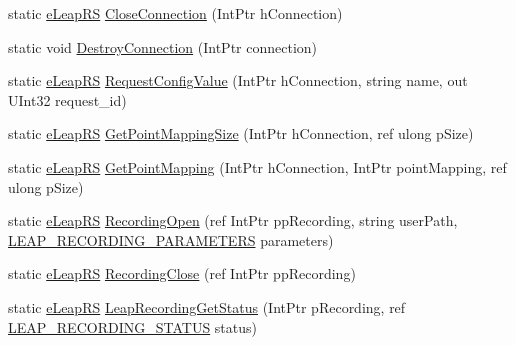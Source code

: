 \begin{DoxyCompactItemize}
\item 
static \mbox{\hyperlink{namespace_leap_internal_ae50b07d24c508b84273392b6dcbea1d9}{e\+Leap\+RS}} \mbox{\hyperlink{class_leap_internal_1_1_leap_c_af70ec130834b0aa68d9bc8a35d17cc7b}{Close\+Connection}} (Int\+Ptr h\+Connection)
\item 
static void \mbox{\hyperlink{class_leap_internal_1_1_leap_c_aa8924a99915ab03a814c211b9a9536c3}{Destroy\+Connection}} (Int\+Ptr connection)
\item 
static \mbox{\hyperlink{namespace_leap_internal_ae50b07d24c508b84273392b6dcbea1d9}{e\+Leap\+RS}} \mbox{\hyperlink{class_leap_internal_1_1_leap_c_a9dd1b57cd651b609b45e8e476802f86b}{Request\+Config\+Value}} (Int\+Ptr h\+Connection, string name, out U\+Int32 request\+\_\+id)
\item 
static \mbox{\hyperlink{namespace_leap_internal_ae50b07d24c508b84273392b6dcbea1d9}{e\+Leap\+RS}} \mbox{\hyperlink{class_leap_internal_1_1_leap_c_a4daa8c0a407f4137fa9ee27bdda02adb}{Get\+Point\+Mapping\+Size}} (Int\+Ptr h\+Connection, ref ulong p\+Size)
\item 
static \mbox{\hyperlink{namespace_leap_internal_ae50b07d24c508b84273392b6dcbea1d9}{e\+Leap\+RS}} \mbox{\hyperlink{class_leap_internal_1_1_leap_c_a39052bbaaa77cce6bf489a8cdc57d12a}{Get\+Point\+Mapping}} (Int\+Ptr h\+Connection, Int\+Ptr point\+Mapping, ref ulong p\+Size)
\item 
static \mbox{\hyperlink{namespace_leap_internal_ae50b07d24c508b84273392b6dcbea1d9}{e\+Leap\+RS}} \mbox{\hyperlink{class_leap_internal_1_1_leap_c_a10463b1cc87a5cc7b102a69d5b99c06b}{Recording\+Open}} (ref Int\+Ptr pp\+Recording, string user\+Path, \mbox{\hyperlink{struct_leap_internal_1_1_leap_c_1_1_l_e_a_p___r_e_c_o_r_d_i_n_g___p_a_r_a_m_e_t_e_r_s}{L\+E\+A\+P\+\_\+\+R\+E\+C\+O\+R\+D\+I\+N\+G\+\_\+\+P\+A\+R\+A\+M\+E\+T\+E\+RS}} parameters)
\item 
static \mbox{\hyperlink{namespace_leap_internal_ae50b07d24c508b84273392b6dcbea1d9}{e\+Leap\+RS}} \mbox{\hyperlink{class_leap_internal_1_1_leap_c_a05178f96e5b75934ec9e6a80156e3a6e}{Recording\+Close}} (ref Int\+Ptr pp\+Recording)
\item 
static \mbox{\hyperlink{namespace_leap_internal_ae50b07d24c508b84273392b6dcbea1d9}{e\+Leap\+RS}} \mbox{\hyperlink{class_leap_internal_1_1_leap_c_a6dd578229acf4c12f114e137f1cf3f10}{Leap\+Recording\+Get\+Status}} (Int\+Ptr p\+Recording, ref \mbox{\hyperlink{struct_leap_internal_1_1_leap_c_1_1_l_e_a_p___r_e_c_o_r_d_i_n_g___s_t_a_t_u_s}{L\+E\+A\+P\+\_\+\+R\+E\+C\+O\+R\+D\+I\+N\+G\+\_\+\+S\+T\+A\+T\+US}} status)

\end{DoxyCompactItemize}
